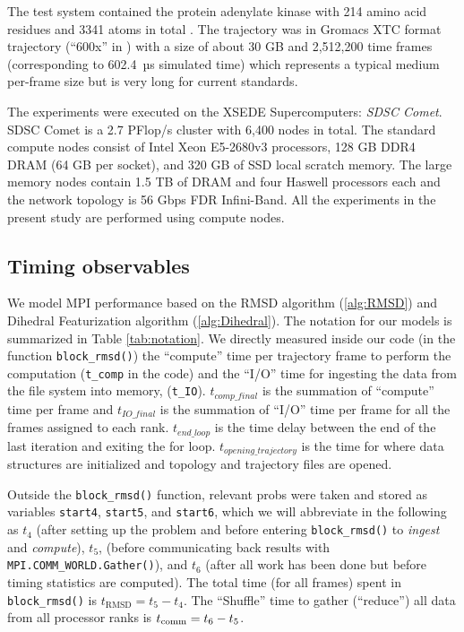 \label{methods}
The test system contained the protein adenylate kinase with 214 amino acid residues and 3341 atoms in total \citep{Seyler:2014il}. 
The trajectory was in Gromacs XTC format trajectory (``600x'' in \citet{Khoshlessan:2017ab}) with a size of about 30 GB and 2,512,200
time frames (corresponding to 602.4~µs simulated time) which represents a typical medium per-frame size but is very long for
current standards.

The experiments were executed on the XSEDE Supercomputers: \emph{SDSC Comet}. 
SDSC Comet is a 2.7 PFlop/s cluster with 6,400 nodes in total.
The standard compute nodes consist of Intel Xeon E5-2680v3 processors, 128 GB DDR4 DRAM (64 GB per socket), and 320 GB of SSD local scratch memory. 
The large memory nodes contain 1.5 TB of DRAM and four Haswell processors each and the network topology is 56 Gbps FDR Infini-Band.
All the experiments in the present study are performed using compute nodes.

\subsection*{Timing observables}
We model MPI performance based on the RMSD algorithm (\ref{alg:RMSD}) and Dihedral Featurization algorithm (\ref{alg:Dihedral}). 
The notation for our models is summarized in Table \ref{tab:notation}.
We directly measured inside our code (in the function \texttt{block\_rmsd()}) the ``compute'' time per
trajectory frame to perform the computation \tcomp (\texttt{t\_comp} in the code) and the ``I/O'' time for
ingesting the data from the file system into memory, \tIO (\texttt{t\_IO}). 
$t_{comp\_final}$ is the summation of ``compute'' time per frame and $t_{IO\_final}$ is the summation of ``I/O'' time per frame for all the frames assigned to each rank. 
$t_{end\_loop}$ is the time delay between the end of the last iteration and exiting the for loop.
$t_{opening\_trajectory}$ is the time for where data structures are initialized and topology and trajectory files are opened.

Outside the \texttt{block\_rmsd()} function, relevant probs were taken and stored as variables \texttt{start4},
\texttt{start5}, and \texttt{start6}, which we will abbreviate in the following as $t_{4}$ (after setting up the problem
and before entering \texttt{block\_rmsd()} to \emph{ingest} and \emph{compute}), $ t_{5}$, (before communicating back results with
\texttt{MPI.COMM\_WORLD.Gather()}), and $t_{6}$ (after all work has been done but before timing statistics are computed).  
The total time (for all frames) spent in \texttt{block\_rmsd()} is $t_{\text{RMSD}} = t_{5} - t_{4}$. 
The ``Shuffle'' time to gather (``reduce'') all data from all processor ranks is $t_{\text{comm}} = t_{6} - t_{5}$.


